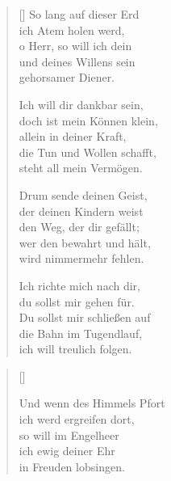 \begin{multicols}{2}
\begin{verse}[\versewidth]
 So lang auf dieser Erd\\
ich Atem holen werd,\\
o Herr, so will ich dein\\
und deines Willens sein\\
gehorsamer Diener.

 Ich will dir dankbar sein,\\
doch ist mein Können klein,\\
allein in deiner Kraft,\\
die Tun und Wollen schafft,\\
steht all mein Vermögen.

 Drum sende deinen Geist,\\
der deinen Kindern weist\\
den Weg, der dir gefällt;\\
wer den bewahrt und hält,\\
wird nimmermehr fehlen.

 Ich richte mich nach dir,\\
du sollst mir gehen für.\\
Du sollst mir schließen auf\\
die Bahn im Tugendlauf,\\
ich will treulich folgen.

\end{verse}
\end{multicols}


\begin{center}
\settowidth{\versewidth}{Und wenn des Himmels Pfort}
\begin{verse}[\versewidth]

 Und wenn des Himmels Pfort\\
ich werd ergreifen dort,\\
so will im Engelheer\\
ich ewig deiner Ehr\\
in Freuden lobsingen.  
  
\end{verse}
\end{center}

